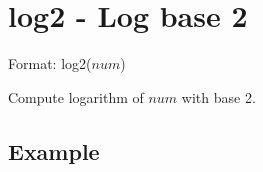 
%

\section{log2 - Log base 2\label{sect:log2}}

Format: log2($num$)

Compute logarithm of $num$ with base 2. 


\subsection*{Example}


%
